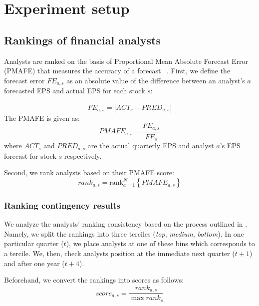 \documentclass[a4paper,twoside,12pt,openright,notitlepage]{report}\usepackage[]{graphicx}\usepackage[]{color}
\begin{document}
\section{Experiment setup}
\label{ch3-sec:exp_setup}
\subsection{Rankings of financial analysts}
\label{ch3:eps-rank}
Analysts are ranked on the basis of Proportional Mean Absolute Forecast Error (PMAFE) that measures the accuracy of a forecast ~\citep{clement1999,brown2001,ertimur2007}. First,  we define the forecast  error  $FE_{a,s}$ as an absolute value of the difference between an analyst's $a$ forecasted EPS  and actual EPS for each stock $s$:

\begin{equation}
FE_{a,s}=|{ACT_{s}-PRED_{a,s}}|
\end{equation}
The PMAFE is given as:
\begin{equation}
PMAFE_{a,s}= \frac{FE_{a,s}}{\overline{FE_{s}}}
\end{equation}
where $ACT_{s}$ and $PRED_{a,s}$ are the actual quarterly EPS and  analyst $a$'s EPS forecast for stock $s$ respectively.

Second, we rank analysts based on their PMAFE score:
\begin{equation}
\label{ch3-eps:rank}
rank_{a,s}=\mathrm{rank}_{a=1}^{N} \left\{ PMAFE_{a,s} \right\}
\end{equation}



\subsubsection{Ranking contingency results}
\label{ch3-tab:rank-contin}

We analyze the analysts' ranking consistency based on the process outlined in \cite{aiguzhinov2015a}.  Namely, we split the rankings into three terciles (\textit{top}, \textit{medium}, \textit{bottom}). In one particular quarter ($t$), we place  analysts at one of these bins which corresponds to a tercile. We, then,  check analysts position at the immediate next quarter ($t+1$) and after one year ($t+4$).

Beforehand, we convert the rankings into scores as follows:
\begin{equation}
\label{ch3-eq:score}
score_{a,s}=\frac{rank_{a,s}}{\max{rank_s}}
\end{equation}
\end{document}
